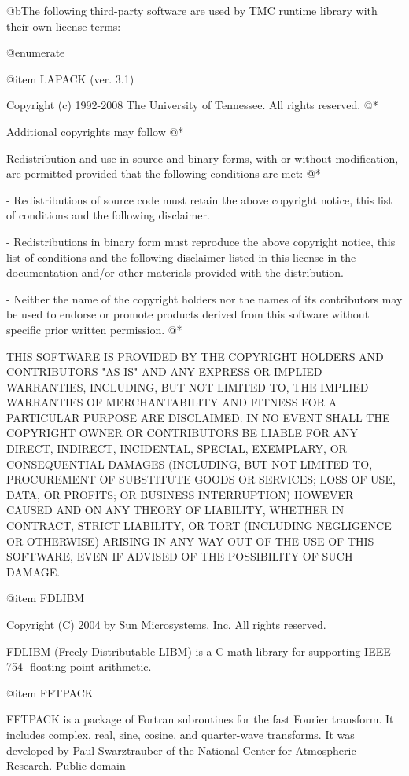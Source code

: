 @b{The following third-party software are used by TMC runtime library with their own license terms:}

@enumerate

@item LAPACK (ver. 3.1)

Copyright (c) 1992-2008 The University of Tennessee.  All rights reserved. @*

Additional copyrights may follow @*


Redistribution and use in source and binary forms, with or without
modification, are permitted provided that the following conditions are
met: @*

- Redistributions of source code must retain the above copyright
  notice, this list of conditions and the following disclaimer. 
  
- Redistributions in binary form must reproduce the above copyright
  notice, this list of conditions and the following disclaimer listed
  in this license in the documentation and/or other materials
  provided with the distribution.
  
- Neither the name of the copyright holders nor the names of its
  contributors may be used to endorse or promote products derived from
  this software without specific prior written permission. @*
  
THIS SOFTWARE IS PROVIDED BY THE COPYRIGHT HOLDERS AND CONTRIBUTORS
"AS IS" AND ANY EXPRESS OR IMPLIED WARRANTIES, INCLUDING, BUT NOT  
LIMITED TO, THE IMPLIED WARRANTIES OF MERCHANTABILITY AND FITNESS FOR
A PARTICULAR PURPOSE ARE DISCLAIMED. IN NO EVENT SHALL THE COPYRIGHT 
OWNER OR CONTRIBUTORS BE LIABLE FOR ANY DIRECT, INDIRECT, INCIDENTAL,
SPECIAL, EXEMPLARY, OR CONSEQUENTIAL DAMAGES (INCLUDING, BUT NOT
LIMITED TO, PROCUREMENT OF SUBSTITUTE GOODS OR SERVICES; LOSS OF USE,
DATA, OR PROFITS; OR BUSINESS INTERRUPTION) HOWEVER CAUSED AND ON ANY
THEORY OF LIABILITY, WHETHER IN CONTRACT, STRICT LIABILITY, OR TORT  
(INCLUDING NEGLIGENCE OR OTHERWISE) ARISING IN ANY WAY OUT OF THE USE
OF THIS SOFTWARE, EVEN IF ADVISED OF THE POSSIBILITY OF SUCH DAMAGE. 


@item FDLIBM

Copyright (C) 2004 by Sun Microsystems, Inc. All rights reserved.

FDLIBM (Freely Distributable LIBM) is a C math library for supporting IEEE 754
-floating-point arithmetic.

@item FFTPACK

FFTPACK is a package of Fortran subroutines for the fast Fourier transform. It includes complex, real, sine, cosine, and quarter-wave transforms. It was developed by Paul Swarztrauber of the National Center for Atmospheric Research.
Public domain

